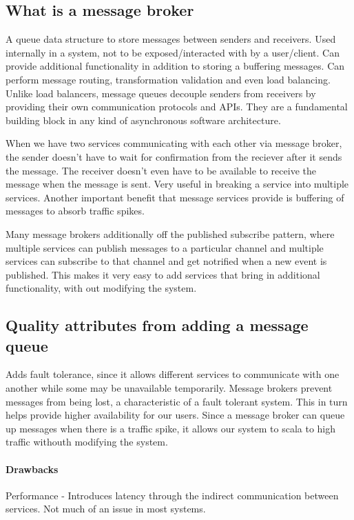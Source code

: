 \subsection{What is a message broker}
A queue data structure to store messages between senders and receivers.
Used internally in a system, not to be exposed/interacted with by a user/client.
Can provide additional functionality in addition to storing a buffering messages.
Can perform message routing, transformation validation and even load balancing.
Unlike load balancers, message queues decouple senders from receivers by providing their own communication protocols and APIs.
They are a fundamental building block in any kind of asynchronous software architecture.

When we have two services communicating with each other via message broker, the sender doesn't have to wait for confirmation from the reciever after it sends the message.
The receiver doesn't even have to be available to receive the message when the message is sent.
Very useful in breaking a service into multiple services.
Another important benefit that message services provide is buffering of messages to absorb traffic spikes.

Many message brokers additionally off the published subscribe pattern, where multiple services can publish messages to a particular channel and multiple services can subscribe to that channel and get notrified when a new event is published.
This makes it very easy to add services that bring in additional functionality, with out modifying the system.

\subsection{Quality attributes from adding a message queue}
Adds fault tolerance, since it allows different services to communicate with one another while some may be unavailable temporarily.
Message brokers prevent messages from being lost, a characteristic of a fault tolerant system.
This in turn helps provide higher availability for our users.
Since a message broker can queue up messages when there is a traffic spike, it allows our system to scala to high traffic withouth modifying the system.

\paragraph{Drawbacks}
Performance - Introduces latency through the indirect communication between services.
Not much of an issue in most systems.

